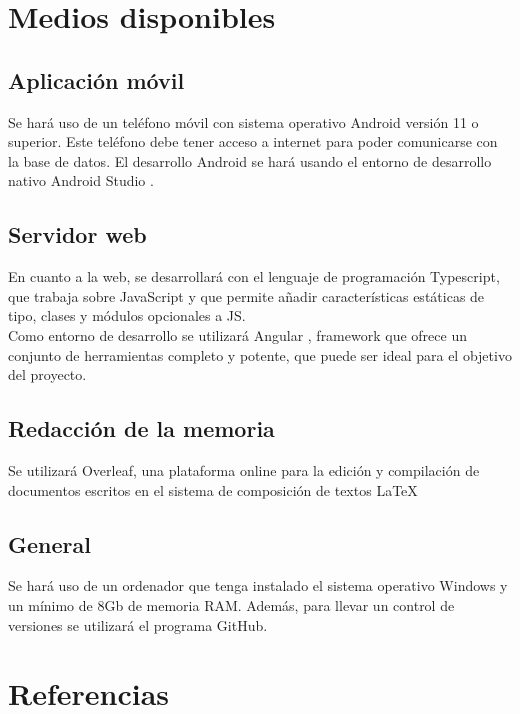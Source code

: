 \documentclass[12pt,oneside,a4paper]{article}
\begin{document}
\section{Medios disponibles}
\hline

    \subsection{Aplicación móvil} Se hará uso de un teléfono móvil con sistema operativo Android versión 11 o superior. Este teléfono debe tener acceso a internet para poder comunicarse con la base de datos.
     El desarrollo Android se hará usando el entorno de desarrollo nativo Android Studio \cite{hohensee2014introduccion}. \\

    \subsection{Servidor web} En cuanto a la web, se desarrollará con el lenguaje de programación Typescript, que trabaja sobre JavaScript y que permite añadir características estáticas de tipo, clases y módulos opcionales a JS. \\ 
    Como entorno de desarrollo se utilizará Angular \cite{wilken2018angular}, framework que ofrece un conjunto de herramientas completo y potente, que puede ser ideal para el objetivo del proyecto. \\

    \subsection{Redacción de la memoria} Se utilizará Overleaf, una plataforma online para la edición y compilación de documentos escritos en el sistema de composición de textos \LaTeX \cite{wikibook}\\

    \subsection{General} Se hará uso de un ordenador que tenga instalado el sistema operativo Windows y un mínimo de 8Gb de memoria RAM. Además, para llevar un control de versiones se utilizará el programa GitHub.






\section{Referencias}



\end{document}

